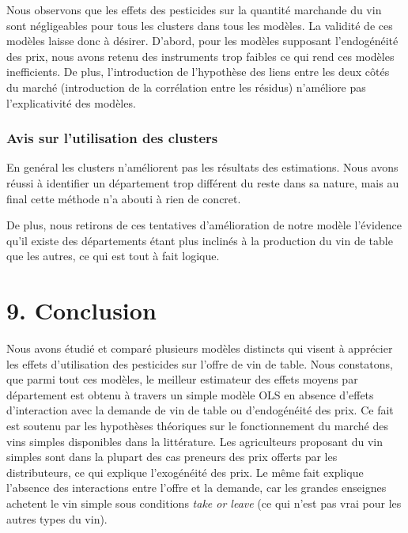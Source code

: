 \documentclass[11pt,]{article}
\begin{document}
\FloatBarrier

Nous observons que les effets des pesticides sur la quantité marchande
du vin sont négligeables pour tous les clusters dans tous les modèles.
La validité de ces modèles laisse donc à désirer. D'abord, pour les
modèles supposant l'endogénéité des prix, nous avons retenu des
instruments trop faibles ce qui rend ces modèles inefficients. De plus,
l'introduction de l'hypothèse des liens entre les deux côtés du marché
(introduction de la corrélation entre les résidus) n'améliore pas
l'explicativité des modèles.

\hypertarget{avis-sur-lutilisation-des-clusters}{%
\subsubsection{Avis sur l'utilisation des
clusters}\label{avis-sur-lutilisation-des-clusters}}

En genéral les clusters n'améliorent pas les résultats des estimations.
Nous avons réussi à identifier un département trop différent du reste
dans sa nature, mais au final cette méthode n'a abouti à rien de
concret.

De plus, nous retirons de ces tentatives d'amélioration de notre modèle
l'évidence qu'il existe des départements étant plus inclinés à la
production du vin de table que les autres, ce qui est tout à fait
logique.

\hypertarget{conclusion}{%
\section{9. Conclusion}\label{conclusion}}

Nous avons étudié et comparé plusieurs modèles distincts qui visent à
apprécier les effets d'utilisation des pesticides sur l'offre de vin de
table. Nous constatons, que parmi tout ces modèles, le meilleur
estimateur des effets moyens par département est obtenu à travers un
simple modèle OLS en absence d'effets d'interaction avec la demande de
vin de table ou d'endogénéité des prix. Ce fait est soutenu par les
hypothèses théoriques sur le fonctionnement du marché des vins simples
disponibles dans la littérature. Les agriculteurs proposant du vin
simples sont dans la plupart des cas preneurs des prix offerts par les
distributeurs, ce qui explique l'exogénéité des prix. Le même fait
explique l'absence des interactions entre l'offre et la demande, car les
grandes enseignes achetent le vin simple sous conditions \emph{take or
leave} (ce qui n'est pas vrai pour les autres types du vin).
\end{document}
